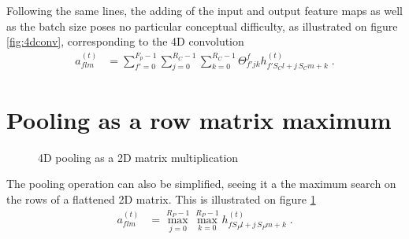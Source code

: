 \begin{subappendices}
Following the same lines, the adding of the input and output feature maps as well as the batch size poses no particular conceptual difficulty, as illustrated on figure \ref{fig:4dconv}, corresponding to the 4D convolution
\begin{align}
a^{(t)}_{flm}&=
%
\sum_{f'=0}^{F_p-1}\sum_{j=0}^{R_C-1}\sum_{k=0}^{R_C-1}\Theta^f_{f'jk}h^{(t)}_{f'S_Cl+j\,S_Cm+k}\;.
\end{align}


\section{Pooling as a row matrix maximum}

\begin{figure}[H]
\begin{center}
\caption{\label{fig:4dpool}4D pooling as a 2D matrix multiplication}
\end{center}
\end{figure}

The pooling operation can also be simplified, seeing it a the maximum search on the rows of a flattened 2D matrix. This is illustrated on figure \ref{fig:4dpool}
\begin{align}
a^{(t)}_{flm}&=
%
\max_{j=0}^{R_P-1}\max_{k=0}^{R_P-1}h^{(t)}_{fS_Pl+j\,S_Pm+k}\;.
\end{align}
\end{subappendices}